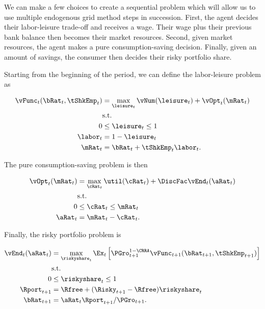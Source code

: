 \documentclass[\econtexRoot/SequentialEGM]{subfiles}
\begin{document}
We can make a few choices to create a sequential problem which will allow us to use multiple endogenous grid method steps in succession. First, the
agent decides their labor-leisure trade-off and receives a wage. Their wage
plus their previous bank balance then becomes their market resources. Second, given
market resources, the agent makes a pure consumption-saving decision. Finally, given an amount of savings, the consumer then decides their risky portfolio share.

Starting from the beginning of the period, we can define the labor-leisure problem as

\begin{equation}
    \begin{split}
        \vFunc_{t}(\bRat_{t}, \tShkEmp_{t}) & = \max_{ \leisure_{t}}
        \vNum(\leisure_{t}) + \vOpt_{t} (\mRat_{t}) \\
        & \text{s.t.} \\
        0 & \leq \leisure_{t} \leq 1 \\
        \labor_{t} & = 1 - \leisure_{t} \\
        \mRat_{t} & = \bRat_{t} + \tShkEmp_{t}\labor_{t}.
    \end{split}
\end{equation}

The pure consumption-saving problem is then

\begin{equation}
    \begin{split}
        \vOpt_{t}(\mRat_{t}) & = \max_{\cRat_{t}} \util(\cRat_{t}) + \DiscFac\vEnd_{t}(\aRat_{t}) \\
        & \text{s.t.} \\
        0 & \leq \cRat_{t} \leq \mRat_{t} \\
        \aRat_{t} & = \mRat_{t} - \cRat_{t}.
    \end{split}
\end{equation}

Finally, the risky portfolio problem is

\begin{equation}
    \begin{split}
        \vEnd_{t}(\aRat_{t}) & = \max_{\riskyshare_{t}}
        \Ex_{t} \left[ \PGro_{t+1}^{1-\CRRA}
            \vFunc_{t+1}(\bRat_{t+1},
            \tShkEmp_{t+1}) \right] \\
        & \text{s.t.} \\
        0 & \leq \riskyshare_{t} \leq 1 \\
        \Rport_{t+1} & = \Rfree + (\Risky_{t+1} - \Rfree)
        \riskyshare_{t} \\
        \bRat_{t+1} & = \aRat_{t} \Rport_{t+1} / \PGro_{t+1}.
    \end{split}
\end{equation}
\end{document}

